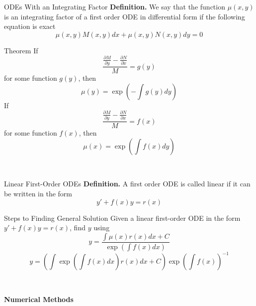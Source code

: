 \documentclass{article}
\begin{document}
\begin{multicols*}{3}
\begin{blackbox}{ODEs With an Integrating Factor}
    \textbf{Definition.} We say that the function $\mu(x,y)$ is an integrating factor of a first order ODE in differential form if the following equation is exact \\[-2ex]
    \[\mu(x,y)M(x,y)dx + \mu(x,y)N(x,y)dy = 0\]
    \begin{redbox}{Theorem}
        If \\[-6ex]
        \[\frac{\frac{\partial M}{\partial y} - \frac{\partial N}{\partial x}}{M} = g(y)\]
        for some function $g(y)$, then\\[-2ex]
        \[\mu(y) = \exp\left(-\int g(y) dy\right)\]
        If \\[-5ex]
        \[\frac{\frac{\partial M}{\partial y} - \frac{\partial N}{\partial x}}{M} = f(x)\]
        for some function $f(x)$, then\\[-2ex]
        \[\mu(x) = \exp\left(\int f(x) dy\right)\]
    \end{redbox}\\[-2ex]
\end{blackbox}
\begin{blackbox}{Linear First-Order ODEs}
    \textbf{Definition.} A first order ODE is called linear if it can be written in the form\\[-2ex]
    \[y' + f(x)y = r(x)\]
    \begin{bluebox}{Steps to Finding General Solution}
        Given a linear first-order ODE in the form $y' + f(x)y = r(x)$, find $y$ using 
        \[y = \frac{\int\mu(x)r(x)dx + C}{\exp\left(\int f(x)dx\right)}\]
        {\footnotesize
        \[y = \left(\int \exp\left(\int f(x)dx\right)r(x)dx + C\right)\exp\left(\int f(x)\right)^{-1}\]
        }
    \end{bluebox}\\[-2ex]
\end{blackbox} 


\end{multicols*}
\begin{center}{\large{\textbf{Numerical Methods}}}\\
\end{center}
\end{document}

